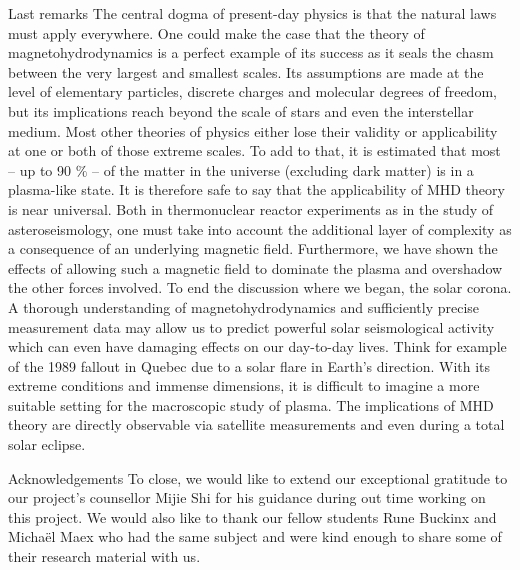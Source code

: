 Last remarks
The central dogma of present-day physics is that the natural laws must apply everywhere. One could make the case that the theory of magnetohydrodynamics is a perfect example of its success as it seals the chasm between the very largest and smallest scales. Its assumptions are made at the level of elementary particles, discrete charges and molecular degrees of freedom, but its implications reach beyond the scale of stars and even the interstellar medium. Most other theories of physics either lose their validity or applicability at one or both of those extreme scales.
To add to that, it is estimated that most – up to 90 $\%$ \citep{notes-principles-MHD}– of the matter in the universe (excluding dark matter) is in a plasma-like state. It is therefore safe to say that the applicability of MHD theory is near universal. Both in thermonuclear reactor experiments as in the study of asteroseismology, one must take into account the additional layer of complexity as a consequence of an underlying magnetic field. Furthermore, we have shown the effects of allowing such a magnetic field to dominate the plasma and overshadow the other forces involved. 
To end the discussion where we began, the solar corona. A thorough understanding of magnetohydrodynamics and sufficiently precise measurement data may allow us to predict powerful solar seismological activity which can even have damaging effects on our day-to-day lives. Think for example of the 1989 fallout in Quebec due to a solar flare in Earth’s direction. With its extreme conditions and immense dimensions, it is difficult to imagine a more suitable setting for the macroscopic study of plasma. The implications of MHD theory are directly observable via satellite measurements and even during a total solar eclipse. 

Acknowledgements
To close, we would like to extend our exceptional gratitude to our project’s counsellor Mijie Shi for his guidance during out time working on this project. We would also like to thank our fellow students Rune Buckinx and Michaël Maex who had the same subject and were kind enough to share some of their research material with us.
